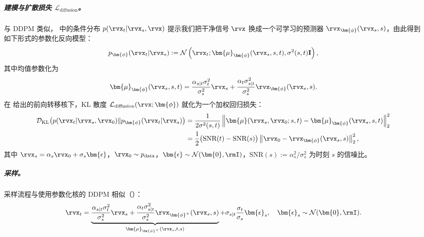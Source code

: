 \subparagraph{建模与扩散损失 $\mathcal{L}_{\text{diffusion}}$。}
与 DDPM 类似， 中的条件分布 $p(\rvx_t|\rvx_s, \rvx)$ 提示我们把干净信号 $\rvx$ 换成一个可学习的预测器 $\rvx_{\bm{\phi}}(\rvx_s, s)$，由此得到如下形式的参数化反向模型：
\begin{align}\label{eq:general-ddpm-sampling}
    p_{\bm{\phi}}(\rvx_t | \rvx_s) := \mathcal{N}\left(\rvx_t; \bm{\mu}_{\bm{\phi}}(\rvx_s, s, t), \sigma^2(s,t) \mathbf{I}\right),
\end{align}
其中均值参数化为
\[
    \bm{\mu}_{\bm{\phi}}(\rvx_s, s, t) = \frac{\alpha_{s|t} \sigma_t^2}{\sigma_s^2} \rvx_s + \frac{\alpha_t \sigma_{s|t}^2}{\sigma_s^2} \rvx_{\bm{\phi}}(\rvx_s, s).
\]
在  给出的前向转移核下，KL 散度 $\mathcal{L}_{\text{diffusion}}(\rvx; \bm{\phi})$ 就化为一个加权回归损失：
\begin{align}
\begin{aligned}
    \label{eq:snr-kl}
    \mathcal{D}_{\text{KL}}\big(p(\rvx_t|\rvx_s, \rvx_0)  \| p_{\bm{\phi}}(\rvx_t|\rvx_s)\big)
    &= \frac{1}{2\sigma^2(s,t)} \left\| \bm{\mu}(\rvx_s, \rvx_0; s,t) - \bm{\mu}_{\bm{\phi}}(\rvx_s, s, t) \right\|_2^2 \\
    &= \frac{1}{2} \big(\text{SNR}(t) - \text{SNR}(s)\big) \left\| \rvx_0 - \rvx_{\bm{\phi}}(\rvx_s, s) \right\|_2^2,
\end{aligned}
\end{align}
其中 $\rvx_s = \alpha_s\rvx_0 + \sigma_s\bm{\epsilon}$，$\rvx_0 \sim p_{\mathrm{data}}$，$\bm{\epsilon} \sim \mathcal{N}(\bm{0}, \rmI)$，$\text{SNR}(s) := \alpha_s^2 / \sigma_s^2$ 为时刻 $s$ 的信噪比。


\subparagraph{采样。}
采样流程与使用参数化核的 DDPM 相似（）：
\begin{align}\label{eq:general-ddpm-sampling-discrete}
    \rvx_t = \underbrace{\frac{\alpha_{s|t} \sigma_t^2}{\sigma_s^2} \rvx_s + \frac{\alpha_t \sigma_{s|t}^2}{\sigma_s^2} \rvx_{\bm{\phi}^\times}(\rvx_s, s)}_{\bm{\mu}_{\bm{\phi}^\times}(\rvx_s, t, s)} + \sigma_{s|t} \frac{\sigma_t}{\sigma_s} \bm{\epsilon}_s,\quad  \bm{\epsilon}_s \sim \mathcal{N}(\bm{0}, \rmI).
\end{align}


